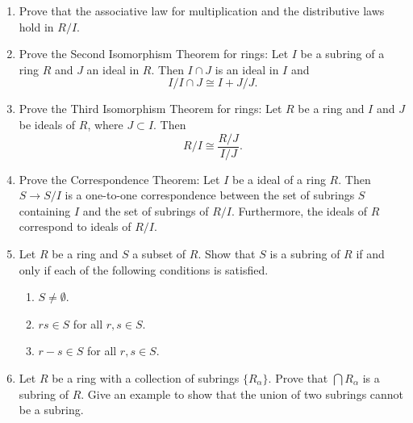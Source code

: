 {\begin{enumerate}
\begin{enumerate}
 \item
If $R$ is a commutative ring, then $\phi(R)$ is a commutative ring. 
 
 \item
$\phi( 0 ) = 0$.
 
 \item
Let $1_R$ and $1_S$ be the identities for $R$ and $S$, respectively.
If $\phi$ is onto, then $\phi(1_R) = 1_S$. 
 
 \item
If $R$ is a field and $\phi(R) \neq 0$, then $\phi(R)$ is a field.
 
\end{enumerate}
 
 
\item
Prove that the associative law for multiplication and the distributive
laws hold in $R/I$. 
 
 
\item
Prove the Second Isomorphism Theorem for rings: Let $I$ be a  subring
of a ring $R$  and  $J$ an ideal in $R$.  Then $I \cap J$ is an ideal
in $I$ and 
\[
I / I \cap J \cong I + J /J.
\]
 
 
\item
Prove the Third Isomorphism Theorem for rings: Let $R$ be a ring and
$I$ and $J$ be ideals of $R$, where $J \subset I$.  Then
\[
R/I \cong \frac{R/J}{I/J}.
\]
 
 
\item
Prove the Correspondence Theorem:
Let $I$ be a ideal of a ring $R$. Then $S \rightarrow S/I$ is a
one-to-one correspondence between the set of subrings $S$ containing
$I$  and the set of subrings of $R/I$. Furthermore, the ideals
of $R$ correspond to ideals of $R/I$.
 
 
 
\item
Let $R$ be a ring and $S$ a subset of $R$.  Show that $S$ is a subring
of $R$ if and only if each of the following conditions is satisfied. 
\begin{enumerate}
 
 \item
$S \neq \emptyset$. 
 
 \item
$rs \in S$ for all $r, s \in S$.
 
 \item
$r-s \in S$ for all $r, s \in S$.
 
\end{enumerate}
 
 
\item
Let $R$ be a ring with a collection of subrings $\{ R_{\alpha} \}$.
Prove that $\bigcap  R_{\alpha}$ is a subring of $R$.  Give an example
to show that the union of two subrings cannot be a subring.
 

\end{enumerate}}
